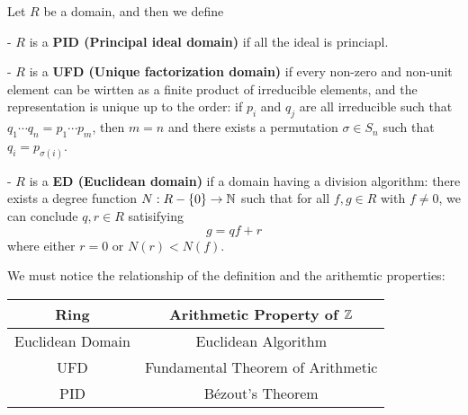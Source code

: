 \documentclass[en,geye,blue,normal,12pt]{elegantnote}
\begin{document}
\begin{definition}
    Let \(R\) be a domain, and then we define

    - \(R\) is a \textbf{PID (Principal ideal domain)} if all the ideal is princiapl.

    - \(R\) is a \textbf{UFD (Unique factorization domain)} if every non-zero and non-unit element can be wirtten as a finite product of irreducible elements, and the representation is unique up to the order: if \(p_i \) and \(q_j\) are all irreducible such that \(q_1 \cdots q_n = p_1 \cdots p_m\), then \(m=n\) and there exists a permutation \(\sigma \in S_n\) such that \(q_i = p_{\sigma(i)}\).

    - \(R\) is a \textbf{ED (Euclidean domain)} if a domain having a division algorithm: there exists a degree function \(N: R-\{0\} \to \mathbb{N}\) such that for all \(f,g \in R\) with \(f \neq 0\), we can conclude \(q, r \in R\) satisifying 
    \[g = qf +r\]
    where either \(r=0\) or \(N(r)<N(f)\).

    \begin{remark}
        We must notice the relationship of the definition and the arithemtic properties: 

\begin{center}
\begin{tabular}{|c|c|}
\hline
\textbf{Ring} & \textbf{Arithmetic Property of \(\mathbb{Z}\)} \\
\hline
Euclidean Domain & Euclidean Algorithm \\
\hline
UFD & Fundamental Theorem of Arithmetic \\
\hline
PID & Bézout's Theorem \\
\hline
\end{tabular}
\end{center}
   \end{remark}
\end{definition}
\end{document}
